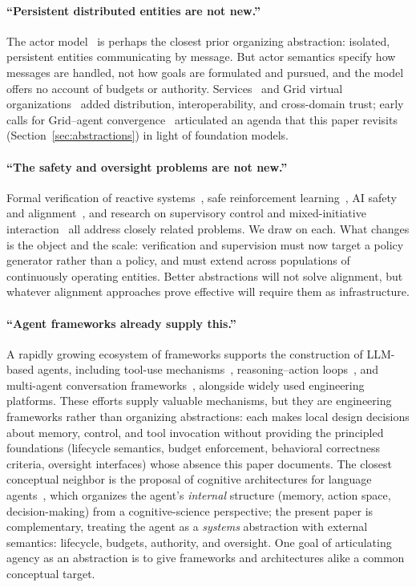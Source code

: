 \documentclass[11pt]{article}
\begin{document}
\paragraph{``Persistent distributed entities are not new.''} The actor model~\cite{hewitt_actors} is perhaps the closest prior organizing abstraction: isolated, persistent entities communicating by message. But actor semantics specify how messages are handled, not how goals are formulated and pursued, and the model offers no account of budgets or authority. Services~\cite{erl_soa} and Grid virtual organizations~\cite{foster_anatomy} added distribution, interoperability, and cross-domain trust; early calls for Grid--agent convergence~\cite{foster_brain_brawn} articulated an agenda that this paper revisits (Section~\ref{sec:abstractions}) in light of foundation models.

\paragraph{``The safety and oversight problems are not new.''} Formal verification of reactive systems~\cite{pnueli_ltl,clarke_ctl}, safe reinforcement learning~\cite{garcia_safe_rl}, AI safety and alignment~\cite{amodei_safety}, and research on supervisory control and mixed-initiative interaction~\cite{horvitz_mixed} all address closely related problems. We draw on each. What changes is the object and the scale: verification and supervision must now target a policy generator rather than a policy, and must extend across populations of continuously operating entities. Better abstractions will not solve alignment, but whatever alignment approaches prove effective will require them as infrastructure.

\paragraph{``Agent frameworks already supply this.''} A rapidly growing ecosystem of frameworks supports the construction of LLM-based agents, including tool-use mechanisms~\cite{schick_toolformer}, reasoning--action loops~\cite{yao2022react}, and multi-agent conversation frameworks~\cite{wu_autogen}, alongside widely used engineering platforms. These efforts supply valuable mechanisms, but they are engineering frameworks rather than organizing abstractions: each makes local design decisions about memory, control, and tool invocation without providing the principled foundations (lifecycle semantics, budget enforcement, behavioral correctness criteria, oversight interfaces) whose absence this paper documents. The closest conceptual neighbor is the proposal of cognitive architectures for language agents~\cite{sumers_coala}, which organizes the agent's \textit{internal} structure (memory, action space, decision-making) from a cognitive-science perspective; the present paper is complementary, treating the agent as a \textit{systems} abstraction with external semantics: lifecycle, budgets, authority, and oversight. One goal of articulating agency as an abstraction is to give frameworks and architectures alike a common conceptual target.
\end{document}
